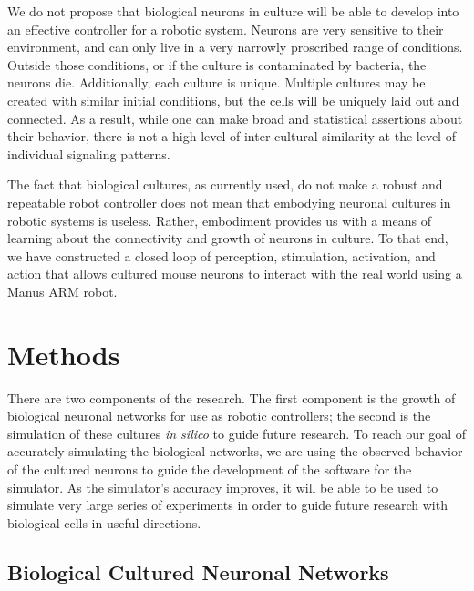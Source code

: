 \documentclass[letterpaper]{article}
\begin{document}
We do not propose that biological neurons in culture will be able to develop into an effective controller for a robotic system.
Neurons are very sensitive to their environment, and can only live in a very narrowly proscribed range of conditions. 
Outside those conditions, or if the culture is contaminated by bacteria, the neurons die. 
Additionally, each culture is unique. Multiple cultures may be created with similar initial conditions, but the cells will be uniquely laid out and connected. 
As a result, while one can make broad and statistical assertions about their behavior, there is not a high level of inter-cultural similarity at the level of individual signaling patterns. 

The fact that biological cultures, as currently used, do not make a robust and repeatable robot controller does not mean that embodying neuronal cultures in robotic systems is useless. 
Rather, embodiment provides us with a means of learning about the connectivity and growth of neurons in culture. 
To that end, we have constructed a closed loop of perception, stimulation, activation, and action that allows cultured mouse neurons to interact with the real world using a Manus ARM robot.

\section{Methods}

There are two components of the research. 
The first component is the growth of biological neuronal networks for use as robotic controllers; the second is the simulation of these cultures \textit{in silico} to guide future research. 
To reach our goal of accurately simulating the biological networks, we are using the observed behavior of the cultured neurons to guide the development of the software for the simulator.
As the simulator's accuracy improves, it will be able to be used to simulate very large series of experiments in order to guide future research with biological cells in useful directions. 

\subsection{Biological Cultured Neuronal Networks}
\end{document}
